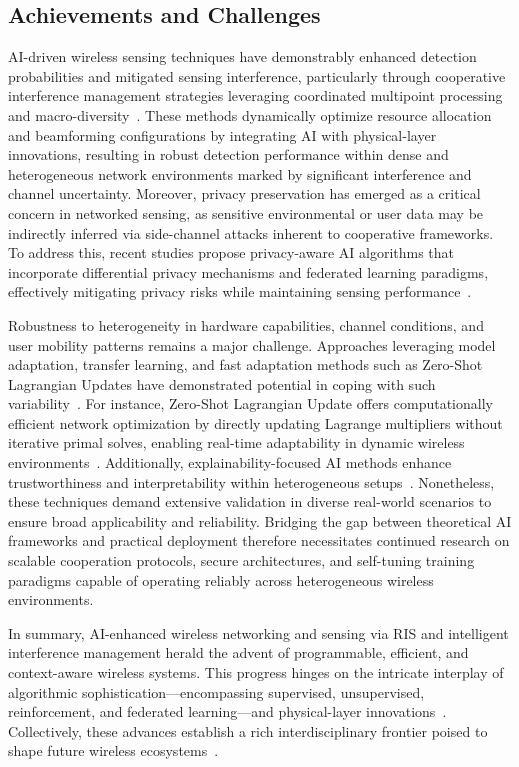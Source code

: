 \documentclass[sigconf]{acmart}
\begin{document}
\subsection{Achievements and Challenges}

AI-driven wireless sensing techniques have demonstrably enhanced detection probabilities and mitigated sensing interference, particularly through cooperative interference management strategies leveraging coordinated multipoint processing and macro-diversity~\cite{ref41,ref42,ref48}. These methods dynamically optimize resource allocation and beamforming configurations by integrating AI with physical-layer innovations, resulting in robust detection performance within dense and heterogeneous network environments marked by significant interference and channel uncertainty. Moreover, privacy preservation has emerged as a critical concern in networked sensing, as sensitive environmental or user data may be indirectly inferred via side-channel attacks inherent to cooperative frameworks. To address this, recent studies propose privacy-aware AI algorithms that incorporate differential privacy mechanisms and federated learning paradigms, effectively mitigating privacy risks while maintaining sensing performance~\cite{ref43,ref48}.

Robustness to heterogeneity in hardware capabilities, channel conditions, and user mobility patterns remains a major challenge. Approaches leveraging model adaptation, transfer learning, and fast adaptation methods such as Zero-Shot Lagrangian Updates have demonstrated potential in coping with such variability~\cite{ref44,ref45}. For instance, Zero-Shot Lagrangian Update offers computationally efficient network optimization by directly updating Lagrange multipliers without iterative primal solves, enabling real-time adaptability in dynamic wireless environments~\cite{ref44}. Additionally, explainability-focused AI methods enhance trustworthiness and interpretability within heterogeneous setups~\cite{ref45}. Nonetheless, these techniques demand extensive validation in diverse real-world scenarios to ensure broad applicability and reliability. Bridging the gap between theoretical AI frameworks and practical deployment therefore necessitates continued research on scalable cooperation protocols, secure architectures, and self-tuning training paradigms capable of operating reliably across heterogeneous wireless environments.

\bigskip

In summary, AI-enhanced wireless networking and sensing via RIS and intelligent interference management herald the advent of programmable, efficient, and context-aware wireless systems. This progress hinges on the intricate interplay of algorithmic sophistication—encompassing supervised, unsupervised, reinforcement, and federated learning—and physical-layer innovations~\cite{ref49}. Collectively, these advances establish a rich interdisciplinary frontier poised to shape future wireless ecosystems~\cite{ref41,ref42,ref43,ref44,ref45,ref48,ref49}.
\end{document}
